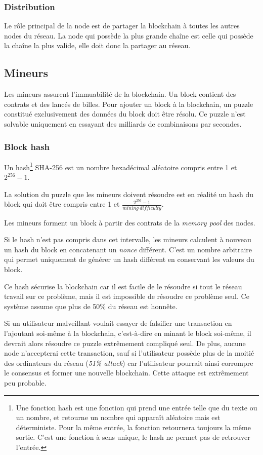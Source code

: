 \documentclass{article}
\begin{document}
\subsubsection{Distribution}
Le rôle principal de la node est de partager la blockchain à toutes les autres nodes du réseau. 
La node qui possède la plus grande chaîne est celle qui possède la chaîne la plus valide, elle doit donc la partager au réseau.

\subsection{Mineurs}
Les mineurs assurent l'immuabilité de la blockchain.
Un block contient des contrats et des lancés de billes. Pour ajouter un block à la blockchain, un puzzle constitué exclusivement des données du block doit être résolu. Ce puzzle n'est solvable uniquement en essayant des milliards de combinaisons par secondes.

\subsubsection{Block hash}

Un hash\footnote{Une fonction hash est une fonction qui prend une entrée telle que du texte ou un nombre, et retourne un nombre qui apparaît aléatoire mais est déterministe. Pour la même entrée, la fonction retournera toujours la même sortie. C'est une fonction à sens unique, le hash ne permet pas de retrouver l'entrée.} SHA-256 est un nombre hexadécimal aléatoire compris entre 1 et $2^{256} - 1$.

La solution du puzzle que les mineurs doivent résoudre est en réalité un hash du block qui doit être compris entre 1 et $\frac{2^{256}-1}{mining\ difficulty}$.

Les mineurs forment un block à partir des contrats de la \textit{memory pool} des nodes.

Si le hash n'est pas compris dans cet intervalle, les mineurs calculent à nouveau un hash du block en concatenant un \textit{nonce} différent. C'est un nombre arbitraire qui permet uniquement de générer un hash différent en conservant les valeurs du block.

Ce hash sécurise la blockchain car il est facile de le résoudre si tout le réseau travail sur ce problème, mais il est impossible de résoudre ce problème seul. Ce système assume que plus de 50\% du réseau est honnête.

Si un utilisateur malveillant voulait essayer de falsifier une transaction en l'ajoutant soi-même à la blockchain, c'est-à-dire en minant le block soi-même, il devrait alors résoudre ce puzzle extrêmement compliqué seul. De plus, aucune node n'accepterai cette transaction, sauf si l'utilisateur possède plus de la moitié des ordinateurs du réseau (\textit{51\% attack}) car l'utilisateur pourrait ainsi corrompre le consensus et former une nouvelle blockchain.
Cette attaque est extrêmement peu probable.
\end{document}
